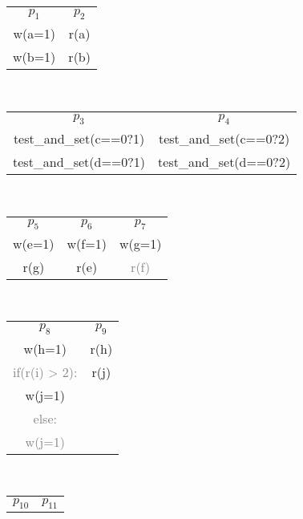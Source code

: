 \begin{figure*}
\begin{subfigure}[t]{.2\linewidth}
\begin{center}
\begin{tabular}{ c c }
 $p_1$ & $p_2$ \\
 w(a=1) & r(a) \\  
 w(b=1) & r(b)    
\end{tabular}
\caption{}
\end{center}
\end{subfigure}
~
\begin{subfigure}[t]{.4\linewidth}
\begin{center}
\begin{tabular}{ c c }
 $p_3$ & $p_4$ \\
 test\_and\_set(c==0?1) & test\_and\_set(c==0?2) \\  
 test\_and\_set(d==0?1) & test\_and\_set(d==0?2)   
\end{tabular}
\caption{}
\end{center}
\end{subfigure}
~
\begin{subfigure}[t]{.3\linewidth}
\begin{center}
\begin{tabular}{ c c c }
 $p_5$ & $p_6$ & $p_7$ \\
 w(e=1) & w(f=1) & w(g=1) \\  
 r(g) & r(e)    & \textcolor{gray}{r(f)}
\end{tabular}
\caption{}
\end{center}
\end{subfigure}
~
\begin{subfigure}[t]{.2\linewidth}
\begin{center}
\begin{tabular}{ c c }
 $p_8$ & $p_9$ \\
 w(h=1) & r(h) \\  
 \textcolor{gray}{if(r(i) > 2):} & r(j) \\
 w(j=1) & \\
 \textcolor{gray}{else:} & \\
 \textcolor{gray}{w(j=1)}
\end{tabular}
\caption{}
\end{center}
\end{subfigure}
~
\begin{subfigure}[t]{.2\linewidth}
\begin{center}
\begin{tabular}{ c c }
 $p_{10}$ & $p_{11}$ \\

\end{tabular}
\end{center}
\end{subfigure}
\end{figure*}
